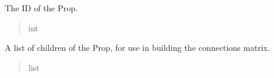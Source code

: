 \documentclass[letterpaper,10pt,english]{sphinxmanual}
\begin{document}
\begin{fulllineitems}
\begin{fulllineitems}
\label{\detokenize{nodes:nodes.nodeBuilder.Prop.ID}}
\pysigstartsignatures
\pysigline
{}
\pysigstopsignatures
\sphinxAtStartPar
The ID of the Prop.
\begin{quote}\begin{description}
\sphinxAtStartPar
int

\end{description}\end{quote}

\end{fulllineitems}


\begin{fulllineitems}
\label{\detokenize{nodes:nodes.nodeBuilder.Prop.children}}
\pysigstartsignatures
\pysigline
{}
\pysigstopsignatures
\sphinxAtStartPar
A list of children of the Prop, for use in building the connections matrix.
\begin{quote}\begin{description}
\sphinxAtStartPar
list

\end{description}\end{quote}

\end{fulllineitems}


\end{fulllineitems}

\end{document}
